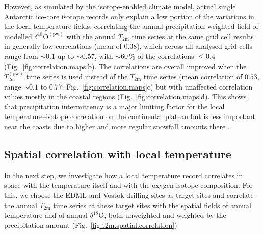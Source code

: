 \documentclass[cp]{copernicus}
\begin{document}
However, as simulated by the isotope-enabled climate model, actual single
Antarctic ice-core isotope records only explain a low portion of the variations
in the local temperature fields: correlating the annual precipitation-weighted
field of modelled $\delta^{18}\mathrm{O}^{\mathrm{(pw)}}$ with the annual
$T_{2\mathrm{m}}$ time series at the same grid cell results in generally low
correlations (mean of $0.38$), which across all analysed grid cells range from
$\sim0.1$ up to $\sim0.57$, with $\sim60\,\%$ of the correlations $\leq0.4$
(Fig.~\ref{fig:correlation.maps}b). The correlations are overall improved when
the $T_{2\mathrm{m}}^{\mathrm{(pw)}}$ time series is used instead of the
$T_{2\mathrm{m}}$ time series (mean correlation of $0.53$, range $\sim0.1$ to
$0.77$; Fig.~\ref{fig:correlation.maps}c) but with unaffected correlation values
mostly in the coastal regions (Fig.~\ref{fig:correlation.maps}d). This shows
that precipitation intermittency is a major limiting factor for the local
temperature--isotope correlation on the continental plateau but is less
important near the coasts due to higher and more regular snowfall amounts there
\citep{Casado2020}.

\subsection{Spatial correlation with local temperature}
\label{results:t2m.spatial.correlation}

In the next step, we investigate how a local temperature record correlates in
space with the temperature itself and with the oxygen isotope composition. For
this, we choose the EDML and Vostok drilling sites as target sites and correlate
the annual $T_{2\mathrm{m}}$ time series at these target sites with the spatial
fields of annual temperature and of annual $\delta^{18}\mathrm{O}$, both
unweighted and weighted by the precipitation amount
(Fig.~\ref{fig:t2m.spatial.correlation}).
\end{document}
